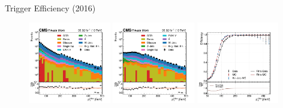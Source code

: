 \makeatletter
  \graphicspath{ {@path} }
\makeatother


\begin{frame}[fragile]{Trigger Efficiency (2016)}
  \begin{figure}[htpb]
    \centering
    \includegraphics[width=0.32\textwidth]{fig/trigger/Misc-MET-Trigger-Eff_2016_den.pdf}
    \includegraphics[width=0.32\textwidth]{fig/trigger/Misc-MET-Trigger-Eff_2016_num.pdf}
    \includegraphics[width=0.32\textwidth]{fig/trigger/Misc-MET-Trigger-Eff_2016_eff.pdf}
  \end{figure}	
\end{frame}

